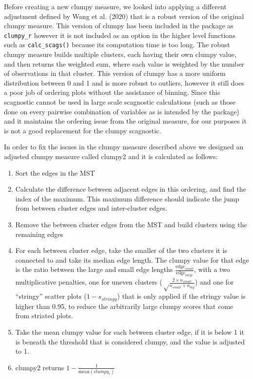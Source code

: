 Before creating a new clumpy measure, we looked into applying a different adjustment defined by Wang et al. (2020) that is a robust version of the original clumpy measure. This version of clumpy has been included in the package as \texttt{clumpy\_r} however it is not included as an option in the higher level functions such as \texttt{calc\_scags()} because its computation time is too long. The robust clumpy measure builds multiple clusters, each having their own clumpy value, and then returns the weighted sum, where each value is weighted by the number of observations in that cluster. This version of clumpy has a more uniform distribution between 0 and 1 and is more robust to outliers, however it still does a poor job of ordering plots without the assistance of binning. Since this scagnostic cannot be used in large scale scagnostic calculations (such as those done on every pairwise combination of variables as is intended by the package) and it maintains the ordering issue from the original measure, for our purposes it is not a good replacement for the clumpy scagnostic.

In order to fix the issues in the clumpy measure described above we designed an adjusted clumpy measure called clumpy2 and it is calculated as follows:

\begin{enumerate}
\def\labelenumi{\arabic{enumi}.}
\tightlist
\item
  Sort the edges in the MST
\item
  Calculate the difference between adjacent edges in this ordering, and find the index of the maximum. This maximum difference should indicate the jump from between cluster edges and inter-cluster edges.
\item
  Remove the between cluster edges from the MST and build clusters using the remaining edges
\item
  For each between cluster edge, take the smaller of the two clusters it is connected to and take its median edge length. The clumpy value for that edge is the ratio between the large and small edge lengths \(\frac{\mbox{edge}_{small}}{\mbox{edge}_{large}}\), with a two multiplicative penalties, one for uneven clusters (\(\sqrt\frac{2\times n_{small}}{n_{small}+n_{big}}\)) and one for ``stringy'' scatter plots (\(1-s_{stringy}\)) that is only applied if the stringy value is higher than 0.95, to reduce the arbitrarily large clumpy scores that come from striated plots.
\item
  Take the mean clumpy value for each between cluster edge, if it is below 1 it is beneath the threshold that is considered clumpy, and the value is adjusted to 1.
\item
  clumpy2 returns \(1-\frac{1}{\mbox{mean}(clumpy_i)}\)
\end{enumerate}

